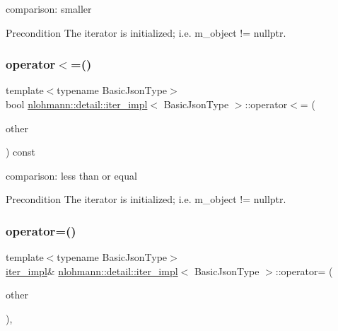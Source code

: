 comparison\+: smaller 

\begin{DoxyPrecond}{Precondition}
The iterator is initialized; i.\+e. {\ttfamily m\+\_\+object != nullptr}. 
\end{DoxyPrecond}
\mbox{\label{classnlohmann_1_1detail_1_1iter__impl_ac6f71b36d7c87e427d1fee83f2600fad}} 
\subsubsection{\texorpdfstring{operator$<$=()}{operator<=()}}
{\footnotesize\ttfamily template$<$typename Basic\+Json\+Type$>$ \\
bool \hyperlink{classnlohmann_1_1detail_1_1iter__impl}{nlohmann\+::detail\+::iter\+\_\+impl}$<$ Basic\+Json\+Type $>$\+::operator$<$= (\begin{DoxyParamCaption}\item[{const \hyperlink{classnlohmann_1_1detail_1_1iter__impl}{iter\+\_\+impl}$<$ Basic\+Json\+Type $>$ \&}]{other }\end{DoxyParamCaption}) const\hspace{0.3cm}{\ttfamily [inline]}}



comparison\+: less than or equal 

\begin{DoxyPrecond}{Precondition}
The iterator is initialized; i.\+e. {\ttfamily m\+\_\+object != nullptr}. 
\end{DoxyPrecond}
\mbox{\label{classnlohmann_1_1detail_1_1iter__impl_a7159ed1cfe7c423a2baef8bea0c94509}} 
\subsubsection{\texorpdfstring{operator=()}{operator=()}}
{\footnotesize\ttfamily template$<$typename Basic\+Json\+Type$>$ \\
\hyperlink{classnlohmann_1_1detail_1_1iter__impl}{iter\+\_\+impl}\& \hyperlink{classnlohmann_1_1detail_1_1iter__impl}{nlohmann\+::detail\+::iter\+\_\+impl}$<$ Basic\+Json\+Type $>$\+::operator= (\begin{DoxyParamCaption}\item[{const \hyperlink{classnlohmann_1_1detail_1_1iter__impl}{iter\+\_\+impl}$<$ typename std\+::remove\+\_\+const$<$ Basic\+Json\+Type $>$\+::type $>$ \&}]{other }\end{DoxyParamCaption})\hspace{0.3cm}{\ttfamily [inline]}, {\ttfamily [noexcept]}}



